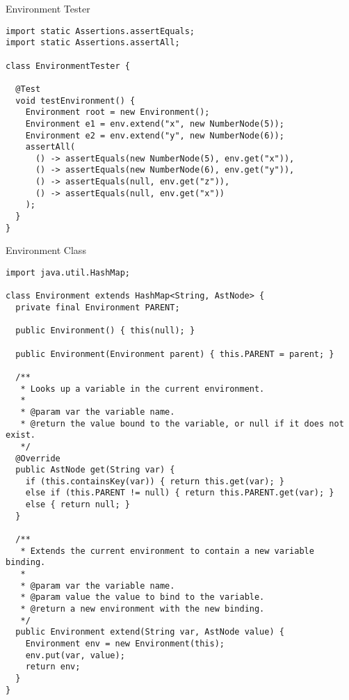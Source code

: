 \begin{cl}{Environment Tester}
\begin{lstlisting}[language=MyJava]
import static Assertions.assertEquals;
import static Assertions.assertAll;

class EnvironmentTester {
  
  @Test
  void testEnvironment() {
    Environment root = new Environment();
    Environment e1 = env.extend("x", new NumberNode(5));
    Environment e2 = env.extend("y", new NumberNode(6));
    assertAll(
      () -> assertEquals(new NumberNode(5), env.get("x")),
      () -> assertEquals(new NumberNode(6), env.get("y")),
      () -> assertEquals(null, env.get("z")),
      () -> assertEquals(null, env.get("x"))
    );
  }
}
\end{lstlisting}
\end{cl}

\begin{cl}{Environment Class}
\begin{lstlisting}[language=MyJava]
import java.util.HashMap;

class Environment extends HashMap<String, AstNode> {
  private final Environment PARENT;

  public Environment() { this(null); }

  public Environment(Environment parent) { this.PARENT = parent; }

  /**
   * Looks up a variable in the current environment.
   * 
   * @param var the variable name.
   * @return the value bound to the variable, or null if it does not exist.
   */
  @Override
  public AstNode get(String var) {
    if (this.containsKey(var)) { return this.get(var); }
    else if (this.PARENT != null) { return this.PARENT.get(var); }
    else { return null; }
  }

  /**
   * Extends the current environment to contain a new variable binding.
   * 
   * @param var the variable name.
   * @param value the value to bind to the variable.
   * @return a new environment with the new binding.
   */
  public Environment extend(String var, AstNode value) {
    Environment env = new Environment(this);
    env.put(var, value);
    return env;
  }
}
\end{lstlisting}
\end{cl}

